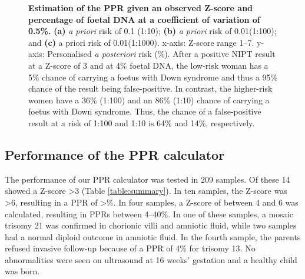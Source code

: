\begin{figure}[!htb]
	{\caption[PPR at different risks]{\textbf{Estimation of the PPR given an observed Z-score and percentage of foetal DNA at a coefficient of variation of 0.5\%.} \textbf{(a)} \textsl{a priori} risk of 0.1 (1:10); \textbf{(b)} \textsl{a priori} risk of 0.01(1:100); and \textbf{(c)} a priori risk of 0.01(1:1000). x-axis: Z-score range 1–7. y-axis: Personalised \textsl{a posteriori} risk (\%). After a positive NIPT result at a Z-score of 3 and at 4\% foetal DNA, the low-risk woman has a 5\% chance of carrying a foetus with Down syndrome and thus a 95\% chance of the result being false-positive. In contrast, the higher-risk women have a 36\% (1:100) and an 86\% (1:10) chance of carrying a foetus with Down syndrome. Thus, the chance of a false-positive result at a risk of 1:100 and 1:10 is 64\% and 14\%, respectively.}
	\label{fig:NIPTRICFig2}}
\end{figure}


\subsection{Performance of the PPR calculator}
The performance of our PPR calculator was tested in 209 samples. 
Of these 14 showed a Z-score \textgreater 3 (Table \ref{table:summary}). In ten samples, the Z-score was \textgreater 6, resulting in a PPR of \textgreater{}\%. In four samples, a Z-score of between 4 and 6 was calculated, resulting in PPRs between 4–40\%. 
In one of these samples, a mosaic trisomy 21 was confirmed in chorionic villi and amniotic fluid, while two samples had a normal diploid outcome in amniotic fluid. 
In the fourth sample, the parents refused invasive follow-up because of a PPR of 4\% for trisomy 13. 
No abnormalities were seen on ultrasound at 16 weeks’ gestation and a healthy child was born.

